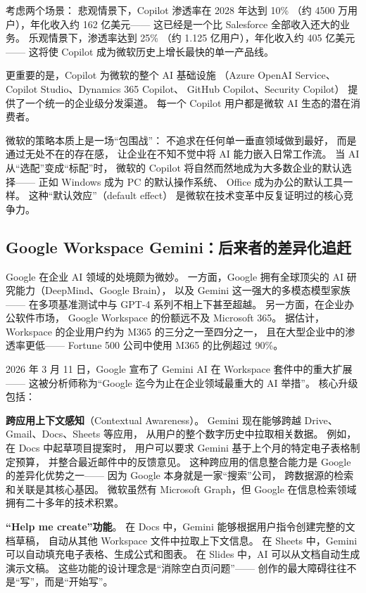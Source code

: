考虑两个场景：
悲观情景下，Copilot 渗透率在 2028 年达到 10\%
（约 4500 万用户），年化收入约 162 亿美元——
这已经是一个比 Salesforce 全部收入还大的业务。
乐观情景下，渗透率达到 25\%
（约 1.125 亿用户），年化收入约 405 亿美元——
这将使 Copilot 成为微软历史上增长最快的单一产品线。

更重要的是，Copilot 为微软的整个 AI 基础设施
（Azure OpenAI Service、Copilot Studio、Dynamics 365 Copilot、
GitHub Copilot、Security Copilot）
提供了一个统一的企业级分发渠道。
每一个 Copilot 用户都是微软 AI 生态的潜在消费者。

微软的策略本质上是一场``包围战''：
不追求在任何单一垂直领域做到最好，
而是通过无处不在的存在感，
让企业在不知不觉中将 AI 能力嵌入日常工作流。
当 AI 从``选配''变成``标配''时，
微软的 Copilot 将自然而然地成为大多数企业的默认选择——
正如 Windows 成为 PC 的默认操作系统、
Office 成为办公的默认工具一样。
这种``默认效应''（default effect）
是微软在技术变革中反复证明过的核心竞争力。

\subsection{Google Workspace Gemini：后来者的差异化追赶}

Google 在企业 AI 领域的处境颇为微妙。
一方面，Google 拥有全球顶尖的 AI 研究能力（DeepMind、Google Brain），
以及 Gemini 这一强大的多模态模型家族——
在多项基准测试中与 GPT-4 系列不相上下甚至超越。
另一方面，在企业办公软件市场，
Google Workspace 的份额远不及 Microsoft 365。
据估计，Workspace 的企业用户约为 M365 的三分之一至四分之一，
且在大型企业中的渗透率更低——
Fortune 500 公司中使用 M365 的比例超过 90\%。

2026 年 3 月 11 日，Google 宣布了 Gemini AI 在 Workspace 套件中的重大扩展——
这被分析师称为``Google 迄今为止在企业领域最重大的 AI 举措''。
核心升级包括：

\textbf{跨应用上下文感知}（Contextual Awareness）。
Gemini 现在能够跨越 Drive、Gmail、Docs、Sheets 等应用，
从用户的整个数字历史中拉取相关数据。
例如，在 Docs 中起草项目提案时，
用户可以要求 Gemini 基于上个月的特定电子表格制定预算，
并整合最近邮件中的反馈意见。
这种跨应用的信息整合能力是 Google 的差异化优势之一——
因为 Google 本身就是一家``搜索''公司，
跨数据源的检索和关联是其核心基因。
微软虽然有 Microsoft Graph，但 Google 在信息检索领域
拥有二十多年的技术积累。

\textbf{``Help me create''功能}。
在 Docs 中，Gemini 能够根据用户指令创建完整的文档草稿，
自动从其他 Workspace 文件中拉取上下文信息。
在 Sheets 中，Gemini 可以自动填充电子表格、生成公式和图表。
在 Slides 中，AI 可以从文档自动生成演示文稿。
这些功能的设计理念是``消除空白页问题''——
创作的最大障碍往往不是``写''，而是``开始写''。

